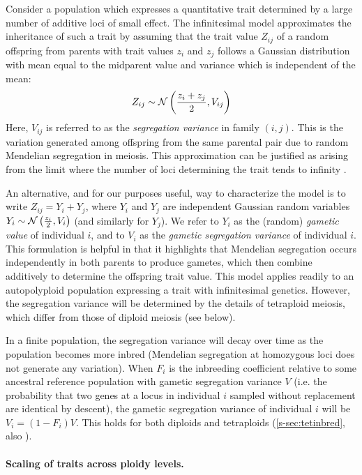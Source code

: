 \documentclass[12pt,a4paper]{article}
\begin{document}
Consider a population which expresses a quantitative trait determined by a
large number of additive loci of small effect.
The infinitesimal model approximates the inheritance of such a trait by
assuming that the trait value $Z_{ij}$ of a random offspring from parents with
trait values $z_i$ and $z_j$ follows a Gaussian distribution with mean equal to
the midparent value and variance which is independent of the mean:
  \begin{align}
  Z_{ij} \sim \mathcal{N}\left(\frac{z_i + z_j}{2}, V_{ij}\right)
  \label{eq:inf}
  \end{align}
Here, $V_{ij}$ is referred to as the \textit{segregation variance} in family
$(i,j)$.
This is the variation generated among offspring from the same parental pair due
to random Mendelian segregation in meiosis.
This approximation can be justified as arising from the limit where the number
of loci determining the trait tends to infinity \citep{barton2017}.

An alternative, and for our purposes useful, way to characterize the model
is to write $Z_{ij} = Y_i + Y_j$, where $Y_i$ and $Y_j$
are independent Gaussian random variables $Y_i \sim \mathcal{N}\left(\frac{z_i}{2},
V_i\right)$ (and similarly for $Y_j$).
We refer to $Y_i$ as the (random) \textit{gametic value} of individual $i$, and
to $V_i$ as the \textit{gametic segregation variance} of individual $i$.
This formulation is helpful in that it highlights that Mendelian segregation
occurs independently in both parents to produce gametes, which then combine
additively to determine the offspring trait value.
This model applies readily to an autopolyploid population expressing a trait
with infinitesimal genetics.
However, the segregation variance will be determined by the details of
tetraploid meiosis, which differ from those of diploid meiosis (see below).

In a finite population, the segregation variance will decay over time as the
population becomes more inbred (Mendelian segregation at homozygous loci does
not generate any variation).
When $F_i$ is the inbreeding coefficient relative to some ancestral reference
population with gametic segregation variance $V$ (i.e. the probability that two
genes at a locus in individual $i$ sampled without replacement are identical by
descent), the gametic segregation variance of individual $i$ will be
$V_i = (1-F_i)V$.
This holds for both diploids and tetraploids (\cref{s-sec:tetinbred}, also
\cite{moody1993}). 

\paragraph{Scaling of traits across ploidy levels.}
\end{document}
